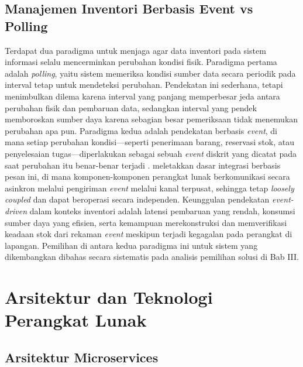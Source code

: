 \subsection{Manajemen Inventori Berbasis Event vs Polling}

Terdapat dua paradigma untuk menjaga agar data inventori pada sistem informasi selalu mencerminkan perubahan kondisi fisik. Paradigma pertama adalah \textit{polling}, yaitu sistem memeriksa kondisi sumber data secara periodik pada interval tetap untuk mendeteksi perubahan. Pendekatan ini sederhana, tetapi menimbulkan dilema karena interval yang panjang memperbesar jeda antara perubahan fisik dan pembaruan data, sedangkan interval yang pendek memboroskan sumber daya karena sebagian besar pemeriksaan tidak menemukan perubahan apa pun. Paradigma kedua adalah pendekatan berbasis \textit{event}, di mana setiap perubahan kondisi---seperti penerimaan barang, reservasi stok, atau penyelesaian tugas---diperlakukan sebagai sebuah \textit{event} diskrit yang dicatat pada saat perubahan itu benar-benar terjadi \autocite{fowler2002}. \textcite{hohpe2003} meletakkan dasar integrasi berbasis pesan ini, di mana komponen-komponen perangkat lunak berkomunikasi secara asinkron melalui pengiriman \textit{event} melalui kanal terpusat, sehingga tetap \textit{loosely coupled} dan dapat beroperasi secara independen. Keunggulan pendekatan \textit{event-driven} dalam konteks inventori adalah latensi pembaruan yang rendah, konsumsi sumber daya yang efisien, serta kemampuan merekonstruksi dan memverifikasi keadaan stok dari rekaman \textit{event} meskipun terjadi kegagalan pada perangkat di lapangan. Pemilihan di antara kedua paradigma ini untuk sistem yang dikembangkan dibahas secara sistematis pada analisis pemilihan solusi di Bab III.

\section{Arsitektur dan Teknologi Perangkat Lunak}
\label{sec:arsitektur-software}

\subsection{Arsitektur Microservices}

